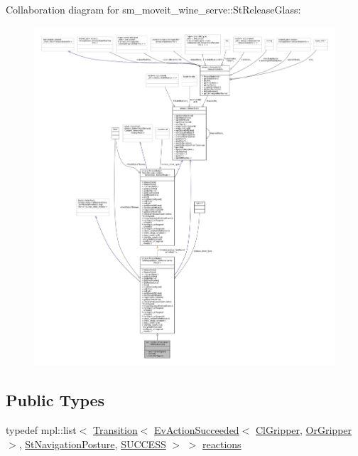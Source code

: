 Collaboration diagram for sm\+\_\+moveit\+\_\+wine\+\_\+serve\+:\+:St\+Release\+Glass\+:
\nopagebreak
\begin{figure}[H]
\begin{center}
\leavevmode
\includegraphics[width=350pt]{structsm__moveit__wine__serve_1_1StReleaseGlass__coll__graph}
\end{center}
\end{figure}
\subsection*{Public Types}
\begin{DoxyCompactItemize}
\item 
typedef mpl\+::list$<$ \hyperlink{classsmacc_1_1Transition}{Transition}$<$ \hyperlink{structsmacc_1_1default__events_1_1EvActionSucceeded}{Ev\+Action\+Succeeded}$<$ \hyperlink{classsm__moveit__wine__serve_1_1cl__gripper_1_1ClGripper}{Cl\+Gripper}, \hyperlink{classsm__moveit__wine__serve_1_1OrGripper}{Or\+Gripper} $>$, \hyperlink{structsm__moveit__wine__serve_1_1StNavigationPosture}{St\+Navigation\+Posture}, \hyperlink{structsmacc_1_1default__transition__tags_1_1SUCCESS}{S\+U\+C\+C\+E\+SS} $>$ $>$ \hyperlink{structsm__moveit__wine__serve_1_1StReleaseGlass_af1674c12703267ddfd7d0ff5fa6394f6}{reactions}
\end{DoxyCompactItemize}
